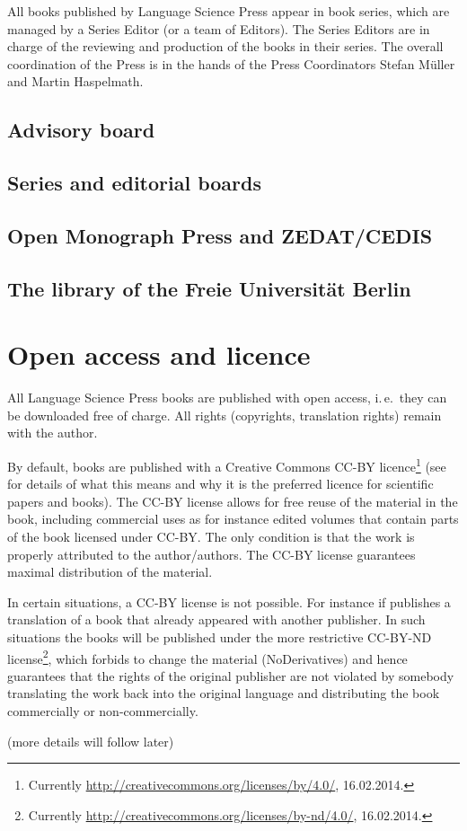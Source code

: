 All books published by Language Science Press appear in book series, which are managed by a Series
Editor (or a team of Editors). The Series Editors are in charge of the reviewing and production of
the books in their series. The overall coordination of the Press is in the hands of the Press
Coordinators Stefan Müller and Martin Haspelmath.

\subsection{Advisory board}



\subsection{Series and editorial boards}

\subsection{Open Monograph Press and ZEDAT/CEDIS}

\subsection{The library of the Freie Universität Berlin}


\section{Open access and licence}

All Language Science Press books are published with open access, i.\,e.\ they can be downloaded free of
charge. All rights (copyrights, translation rights) remain with the author. 

By default, \lsp books are published with a Creative Commons CC-BY licence\footnote{ 
  Currently \url{http://creativecommons.org/licenses/by/4.0/}, 16.02.2014.
} (see  for details
of what this means and why it is the preferred licence for scientific papers and books). The CC-BY
license allows for free reuse of the material in the book, including commercial uses as for instance
edited volumes that contain parts of the book licensed under CC-BY. The only condition is that the
work is properly attributed to the author/authors. The CC-BY license guarantees maximal distribution
of the material.

In certain situations, a CC-BY license is not possible. For instance if \lsp publishes a translation of a
book that already appeared with another publisher. In such situations the books will be published
under the more restrictive CC-BY-ND license\footnote{
Currently \url{http://creativecommons.org/licenses/by-nd/4.0/}, 16.02.2014.
}, which forbids to change the material (NoDerivatives) and hence guarantees that
the rights of the original publisher are not violated by somebody translating the work back into the
original language and distributing the book commercially or non-commercially.


(more details will follow later)


